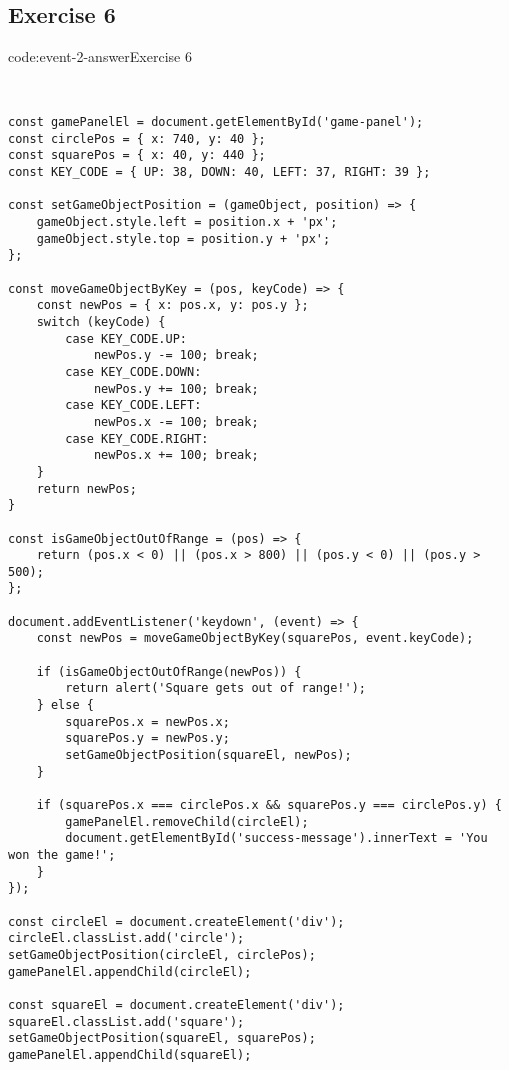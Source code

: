 \subsection*{Exercise 6}

\begin{codeenv}{code:event-2-answer}{Exercise 6}\begin{verbatim}


const gamePanelEl = document.getElementById('game-panel');
const circlePos = { x: 740, y: 40 };
const squarePos = { x: 40, y: 440 };
const KEY_CODE = { UP: 38, DOWN: 40, LEFT: 37, RIGHT: 39 };

const setGameObjectPosition = (gameObject, position) => {
    gameObject.style.left = position.x + 'px';
    gameObject.style.top = position.y + 'px';
};

const moveGameObjectByKey = (pos, keyCode) => {
    const newPos = { x: pos.x, y: pos.y };
    switch (keyCode) {
        case KEY_CODE.UP:
            newPos.y -= 100; break;
        case KEY_CODE.DOWN:
            newPos.y += 100; break;
        case KEY_CODE.LEFT:
            newPos.x -= 100; break;
        case KEY_CODE.RIGHT:
            newPos.x += 100; break;
    }
    return newPos;
}

const isGameObjectOutOfRange = (pos) => {
    return (pos.x < 0) || (pos.x > 800) || (pos.y < 0) || (pos.y > 500);
};

document.addEventListener('keydown', (event) => {
    const newPos = moveGameObjectByKey(squarePos, event.keyCode);

    if (isGameObjectOutOfRange(newPos)) {
        return alert('Square gets out of range!');
    } else {
        squarePos.x = newPos.x;
        squarePos.y = newPos.y;
        setGameObjectPosition(squareEl, newPos);
    }

    if (squarePos.x === circlePos.x && squarePos.y === circlePos.y) {
        gamePanelEl.removeChild(circleEl);
        document.getElementById('success-message').innerText = 'You won the game!';
    }
});

const circleEl = document.createElement('div');
circleEl.classList.add('circle');
setGameObjectPosition(circleEl, circlePos);
gamePanelEl.appendChild(circleEl);

const squareEl = document.createElement('div');
squareEl.classList.add('square');
setGameObjectPosition(squareEl, squarePos);
gamePanelEl.appendChild(squareEl);
\end{verbatim}
\end{codeenv}
